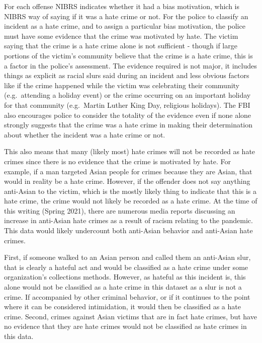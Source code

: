 \documentclass[
  12pt,
  openany]{book}
\begin{document}
For each offense NIBRS indicates whether it had a bias motivation, which is NIBRS way of saying if it was a hate crime or not. For the police to classify an incident as a hate crime, and to assign a particular bias motivation, the police must have some evidence that the crime was motivated by hate. The victim saying that the crime is a hate crime alone is not sufficient - though if large portions of the victim's community believe that the crime is a hate crime, this is a factor in the police's assessment. The evidence required is not major, it includes things as explicit as racial slurs said during an incident and less obvious factors like if the crime happened while the victim was celebrating their community (e.g.~attending a holiday event) or the crime occurring on an important holiday for that community (e.g.~Martin Luther King Day, religious holidays). The FBI also encourages police to consider the totality of the evidence even if none alone strongly suggests that the crime was a hate crime in making their determination about whether the incident was a hate crime or not.

This also means that many (likely most) hate crimes will not be recorded as hate crimes since there is no evidence that the crime is motivated by hate. For example, if a man targeted Asian people for crimes because they are Asian, that would in reality be a hate crime. However, if the offender does not say anything anti-Asian to the victim, which is the mostly likely thing to indicate that this is a hate crime, the crime would not likely be recorded as a hate crime. At the time of this writing (Spring 2021), there are numerous media reports discussing an increase in anti-Asian hate crimes as a result of racism relating to the pandemic. This data would likely undercount both anti-Asian behavior and anti-Asian hate crimes.

First, if someone walked to an Asian person and called them an anti-Asian slur, that is clearly a hateful act and would be classified as a hate crime under some organization's collections methods. However, as hateful as this incident is, this alone would not be classified as a hate crime in this dataset as a slur is not a crime. If accompanied by other criminal behavior, or if it continues to the point where it can be considered intimidation, it would then be classified as a hate crime. Second, crimes against Asian victims that are in fact hate crimes, but have no evidence that they are hate crimes would not be classified as hate crimes in this data.
\end{document}
